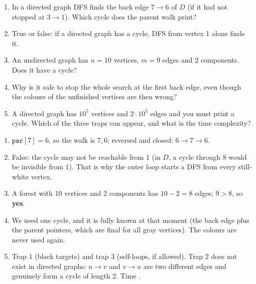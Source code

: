 \begin{enumerate}[leftmargin=*]
    \item In a directed graph DFS finds the back edge $7 \to 6$ of $D$ (if it had not stopped at $3 \to 1$). Which cycle does the parent walk print?
    \item True or false: if a directed graph has a cycle, DFS from vertex 1 alone finds it.
    \item An undirected graph has $n = 10$ vertices, $m = 9$ edges and 2 components. Does it have a cycle?
    \item Why is it safe to stop the whole search at the first back edge, even though the colours of the unfinished vertices are then wrong?
    \item A directed graph has $10^5$ vertices and $2\cdot10^5$ edges and you must print a cycle. Which of the three traps can appear, and what is the time complexity?
\end{enumerate}

\begin{solutionbox}[Answers]
\begin{enumerate}[leftmargin=*]
    \item $\texttt{par}[7] = 6$, so the walk is $7, 6$; reversed and closed: $6 \to 7 \to 6$.
    \item False: the cycle may not be reachable from 1 (in $D$, a cycle through 8 would be invisible from 1). That is why the outer loop starts a DFS from every still-white vertex.
    \item A forest with 10 vertices and 2 components has $10 - 2 = 8$ edges; $9 > 8$, so \textbf{yes}.
    \item We need one cycle, and it is fully known at that moment (the back edge plus the parent pointers, which are final for all gray vertices). The colours are never used again.
    \item Trap 1 (black targets) and trap 3 (self-loops, if allowed). Trap 2 does not exist in directed graphs: $u \to v$ and $v \to u$ are two different edges and genuinely form a cycle of length 2. Time .
\end{enumerate}
\end{solutionbox}
